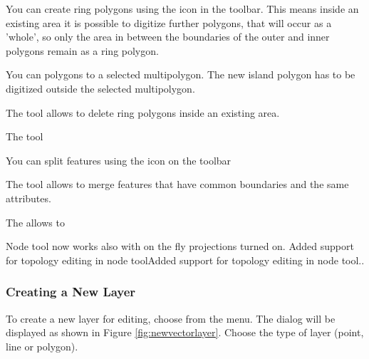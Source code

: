 You can create ring polygons using the 
icon in the toolbar. This means inside an existing area it is
possible to digitize further polygons, that will occur as a 'whole', so only
the area in between the boundaries of the outer and inner polygons remain as
a ring polygon.


You can  polygons to a selected
multipolygon. The new island polygon has to be digitized outside the selected
multipolygon.


The  tool allows to delete ring
polygons inside an existing area.


The  tool 


You can split features using the  icon on the toolbar


The  tool allows to
merge features that have common boundaries and the same attributes.  


The  allows to

Node tool now works also with on the fly projections turned on.
Added support for topology editing in node toolAdded support for topology
editing in node tool..

\subsubsection{Creating a New Layer}\label{sec:create shape}

To create a new layer for editing, choose  from the
 menu. 
The  dialog will be displayed as
shown in Figure \ref{fig:newvectorlayer}. Choose the type of layer (point,
line or polygon).

